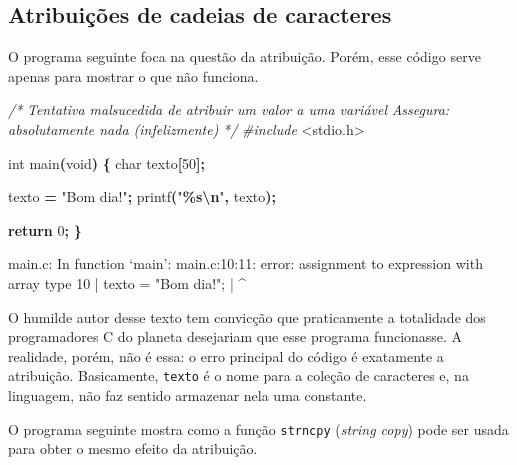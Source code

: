 \documentclass[
  11pt,
  a4paper,
]{scrbook}
\newenvironment{Shaded}{\begin{snugshade}}{\end{snugshade}}
\newcommand{\CommentTok}[1]{\textcolor[rgb]{0.56,0.35,0.01}{\textit{#1}}}
\newcommand{\ControlFlowTok}[1]{\textcolor[rgb]{0.13,0.29,0.53}{\textbf{#1}}}
\newcommand{\DataTypeTok}[1]{\textcolor[rgb]{0.13,0.29,0.53}{#1}}
\newcommand{\DecValTok}[1]{\textcolor[rgb]{0.00,0.00,0.81}{#1}}
\newcommand{\ImportTok}[1]{#1}
\newcommand{\NormalTok}[1]{#1}
\newcommand{\OperatorTok}[1]{\textcolor[rgb]{0.81,0.36,0.00}{\textbf{#1}}}
\newcommand{\PreprocessorTok}[1]{\textcolor[rgb]{0.56,0.35,0.01}{\textit{#1}}}
\newcommand{\SpecialCharTok}[1]{\textcolor[rgb]{0.81,0.36,0.00}{\textbf{#1}}}
\newcommand{\StringTok}[1]{\textcolor[rgb]{0.31,0.60,0.02}{#1}}
\begin{document}
\subsection{Atribuições de cadeias de
caracteres}\label{atribuiuxe7uxf5es-de-cadeias-de-caracteres}

O programa seguinte foca na questão da atribuição. Porém, esse código
serve apenas para mostrar o que não funciona.

\begin{Shaded}
\begin{Highlighting}[]
\CommentTok{/*}
\CommentTok{Tentativa malsucedida de atribuir um valor a uma variável}
\CommentTok{Assegura: absolutamente nada (infelizmente)}
\CommentTok{*/}
\PreprocessorTok{\#include }\ImportTok{\textless{}stdio.h\textgreater{}}

\DataTypeTok{int}\NormalTok{ main}\OperatorTok{(}\DataTypeTok{void}\OperatorTok{)} \OperatorTok{\{}
    \DataTypeTok{char}\NormalTok{ texto}\OperatorTok{[}\DecValTok{50}\OperatorTok{];}

\NormalTok{    texto }\OperatorTok{=} \StringTok{"Bom dia!"}\OperatorTok{;}
\NormalTok{    printf}\OperatorTok{(}\StringTok{"}\SpecialCharTok{\%s\textbackslash{}n}\StringTok{"}\OperatorTok{,}\NormalTok{ texto}\OperatorTok{);}

    \ControlFlowTok{return} \DecValTok{0}\OperatorTok{;}
\OperatorTok{\}}
\end{Highlighting}
\end{Shaded}

\begin{Shaded}
\begin{Highlighting}[]
\NormalTok{main.c: In function ‘main’:}
\NormalTok{main.c:10:11: error: assignment to expression with array type}
\NormalTok{   10 |     texto = "Bom dia!";}
\NormalTok{      |           \^{}}
\end{Highlighting}
\end{Shaded}

O humilde autor desse texto tem convicção que praticamente a totalidade
dos programadores C do planeta desejariam que esse programa funcionasse.
A realidade, porém, não é essa: o erro principal do código é exatamente
a atribuição. Basicamente, \texttt{texto} é o nome para a coleção de
caracteres e, na linguagem, não faz sentido armazenar nela uma
constante.

O programa seguinte mostra como a função \texttt{strncpy} (\emph{string
copy}) pode ser usada para obter o mesmo efeito da atribuição.
\end{document}
